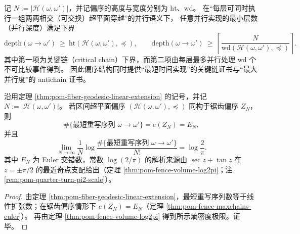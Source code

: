 \begin{corollary}[并行深度与并行宽度的可审计界]\label{cor:pom-fiber-parallelism-poset}
记 \(N:=|\mathcal H(\omega,\omega')|\)，并记偏序的高度与宽度分别为 \(\mathrm{ht}\)、\(\mathrm{wd}\)。
在“每层可同时执行一组两两相交（可交换）超平面穿越”的并行语义下，
任意并行实现的最小层数（并行深度）满足下界
\[
\mathrm{depth}(\omega\to\omega')\ \ge\ \mathrm{ht}(\mathcal H(\omega,\omega'),\preceq),
\qquad
\mathrm{depth}(\omega\to\omega')\ \ge\ \left\lceil \frac{N}{\mathrm{wd}(\mathcal H(\omega,\omega'),\preceq)}\right\rceil.
\]
其中第一项为关键链（critical chain）下界，而第二项由每层最多并行处理 \(\mathrm{wd}\) 个不可比较事件得到。
因此偏序结构同时提供“最短时间实现”的关键链证书与“最大并行度”的 antichain 证书。
\end{corollary}

\begin{corollary}\label{cor:pom-fiber-geodesic-log2pi}
沿用定理 \ref{thm:pom-fiber-geodesic-linear-extension} 的记号，并记 \(N:=|\mathcal H(\omega,\omega')|\)。
若区间超平面偏序 \((\mathcal H(\omega,\omega'),\preceq)\) 同构于锯齿偏序 \(Z_N\)，则
\[
\#\{\text{最短重写序列 } \omega\to \omega'\}=e(Z_N)=E_N,
\]
并且
\[
\lim_{N\to\infty}\frac{1}{N}\log\frac{\#\{\text{最短重写序列 } \omega\to \omega'\}}{N!}
=\log\frac{2}{\pi}.
\]
其中 \(E_N\) 为 Euler 交错数，常数 \(\log(2/\pi)\) 的解析来源由 \(\sec z+\tan z\) 在 \(z=\pm\pi/2\) 的最近奇点支配给出（定理 \ref{thm:pom-fence-volume-log2pi}；注 \ref{rem:pom-quarter-turn-pi2-scale}）。
\end{corollary}
\begin{proof}
由定理 \ref{thm:pom-fiber-geodesic-linear-extension}，最短重写序列数等于线性扩张数；在锯齿偏序情形下 \(e(Z_N)=E_N\)（定理 \ref{thm:pom-fence-maxchains-euler}）。
再由定理 \ref{thm:pom-fence-volume-log2pi} 得到所示熵密度极限。证毕。
\end{proof}

